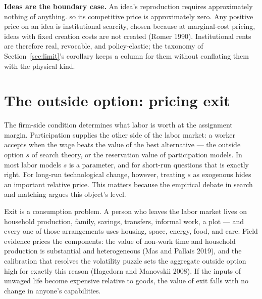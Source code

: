 \documentclass[12pt]{article}
\theoremstyle{plain}
\begin{document}
\textbf{Ideas are the boundary case.} An idea's reproduction requires
approximately nothing of anything. so its competitive price is approximately zero. Any positive
price on an idea is institutional scarcity, chosen because at marginal-cost
pricing, ideas with fixed creation costs are not created (Romer 1990).
Institutional rents are therefore real, revocable, and policy-elastic; the
taxonomy of Section~\ref{sec:limit}'s corollary keeps a column for them
without conflating them with the physical kind.

\section{The outside option: pricing exit}\label{sec:floor}

The firm-side condition determines what labor is worth at the assignment margin.
Participation supplies the other side of the labor market: a worker accepts when
the wage beats the value of the best alternative --- the outside option $s$ of
search theory, or the reservation value of participation models. In most labor
models $s$ is a parameter, and for short-run questions that is exactly right.
For long-run technological change, however, treating $s$ as exogenous hides an important relative price. This matters because the empirical debate in search and matching argues this object's level.

Exit is a consumption problem. A person who leaves the labor market lives on
household production, family, savings, transfers, informal work, a plot --- and
every one of those arrangements uses housing, space, energy, food, and care.
Field evidence prices the components: the value of non-work time and household
production is substantial and heterogeneous (Mas and Pallais 2019), and the
calibration that resolves the volatility puzzle sets the aggregate outside
option high for exactly this reason (Hagedorn and Manovskii 2008). If the inputs
of unwaged life become expensive relative to goods, the value of exit falls with
no change in anyone's capabilities.
\end{document}

